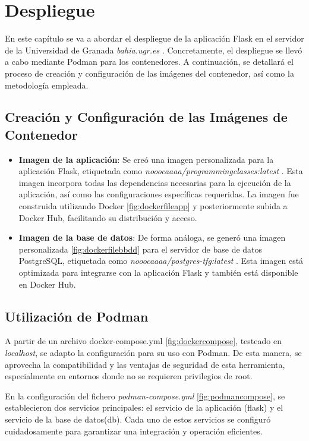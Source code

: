 \chapter{Despliegue} \label{chap:despliegue}

En este capítulo se va a abordar el despliegue de la aplicación Flask en el servidor de la Universidad de Granada \textit{bahia.ugr.es} \cite{bahia}. Concretamente, el despliegue se llevó a cabo mediante Podman \cite{podman} para los contenedores. A continuación, se detallará el proceso de creación y configuración de las imágenes del contenedor, así como la metodología empleada.

\section{Creación y Configuración de las Imágenes de Contenedor}

\begin{itemize}
    \item \textbf{Imagen de la aplicación}: Se creó una imagen personalizada para la aplicación Flask, etiquetada como \textit{nooocaaaa/programmingclasses:latest} \cite{dockerhub}. Esta imagen incorpora todas las dependencias necesarias para la ejecución de la aplicación, así como las configuraciones específicas requeridas. La imagen fue construida utilizando Docker \ref{fig:dockerfileapp} y posteriormente subida a Docker Hub, facilitando su distribución y acceso. 
    \item \textbf{Imagen de la base de datos}:  De forma análoga, se generó una imagen personalizada \ref{fig:dockerfilebbdd} para el servidor de base de datos PostgreSQL, etiquetada como \textit{nooocaaaa/postgres-tfg:latest} \cite{dockerhub2}. Esta imagen está optimizada para integrarse con la aplicación Flask y también está disponible en Docker Hub.
\end{itemize}

\section{Utilización de Podman}

A partir de un archivo docker-compose.yml \ref{fig:dockercompose}, testeado en \textit{localhost}, se adapto la configuración para su uso con Podman. De esta manera, se aprovecha la compatibilidad y las ventajas de seguridad de esta herramienta, especialmente en entornos donde no se requieren privilegios de root.

En la configuración del fichero \textit{podman-compose.yml} \ref{fig:podmancompose}, se establecieron dos servicios principales: el servicio de la aplicación (flask) y el servicio de la base de datos(db). Cada uno de estos servicios se configuró cuidadosamente para garantizar una integración y operación eficientes.

